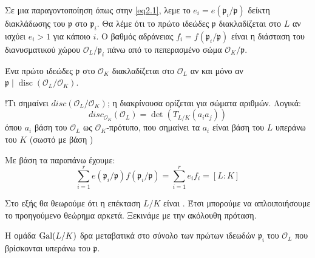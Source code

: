 \documentclass{report}
\begin{document}
\begin{defn}
	Σε μια παραγοντοποίηση όπως στην \ref{eq2.1}, λεμε το $e_i = e(\mathfrak{p}_i / \mathfrak{p})$ δείκτη διακλάδωσης του $\mathfrak{p}$ στο $\mathfrak{p}_i$. Θα λέμε ότι το πρώτο ιδεώδες $\mathfrak{p}$ διακλαδίζεται στο $L$ αν ισχύει $e_i >1$ για κάποιο $i$. Ο βαθμός αδράνειας $f_i = f(\mathfrak{p}_i/ \mathfrak{p})$ είναι η διάσταση του διανυσματικού χώρου $\mathcal{O}_L/\mathfrak{p}_i$ πάνω από το πεπερασμένο σώμα $\mathcal{O}_K/\mathfrak{p}$. 
\end{defn}%

\begin{prop}
	Ένα πρώτο ιδεώδες $\mathfrak{p}$ στο $\mathcal{O}_K$ διακλαδίζεται στο $\mathcal{O}_L$ αν και μόνο αν $\mathfrak{p} \mid \operatorname{disc} (\mathcal{O}_L/\mathcal{O}_K)$.
\end{prop}
!Τι σημαίνει $disc(\mathcal{O}_L/\mathcal{O}_K)$; η διακρίνουσα ορίζεται για σώματα αριθμών. Λογικά:
$$disc_{\mathcal{O}_K} (\mathcal{O}_L) = \det (T_{L/K}(a_ia_j))$$ όπου $a_i$ βάση του $\mathcal{O}_L$ ως $\mathcal{O}_K$-πρότυπο, που σημαίνει τα $a_i$ είναι βάση του $L$ υπεράνω του $K$ (σωστό με βάση )


\begin{theorem}
	Με βάση τα παραπάνω έχουμε:
	\begin{equation}
		\sum\limits_{i=1}^r e(\mathfrak{p}_i/\mathfrak{p}) f(\mathfrak{p}_i/\mathfrak{p}) = \sum\limits_{i=1}^r e_i f_i = [L:K]
	\end{equation}
\end{theorem}


Στο εξής θα θεωρούμε ότι η επέκταση $L/K$ είναι . Έτσι μπορούμε να απλοιποιήσουμε το προηγούμενο θεώρημα αρκετά. Ξεκινάμε με την ακόλουθη πρόταση.

\begin{prop}
	Η ομάδα $\operatorname{Gal}(L/K)$ δρα μεταβατικά στο σύνολο των πρώτων ιδεωδών $\mathfrak{p_i}$ του $\mathcal{O}_L$ που βρίσκονται υπεράνω του $\mathfrak{p}$.
\end{prop}
\end{document}

